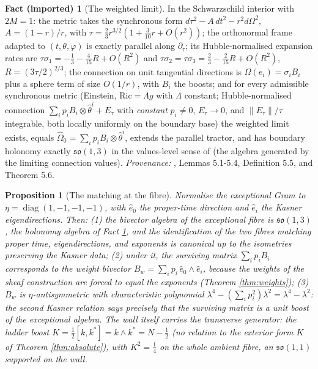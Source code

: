 \documentclass[11pt]{article}
\newtheorem{proposition}[theorem]{Proposition}
\theoremstyle{definition}
\newtheorem{fact}[theorem]{Fact (imported)}
\begin{document}
\begin{fact}[The weighted limit]\label{fact:weightedlimit}
In the Schwarzschild interior with $2M = 1$: the metric takes the synchronous form $d\tau^2 - A\,dt^2 - r^2 d\Omega^2$, $A = (1-r)/r$, with $\tau = \tfrac23 r^{3/2}(1 + \tfrac{3}{10}r + O(r^2))$; the orthonormal frame adapted to $(t, \theta, \varphi)$ is exactly parallel along $\partial_\tau$; its Hubble-normalised expansion rates are $\tau\sigma_1 = -\tfrac13 - \tfrac{4}{15}R + O(R^2)$ and $\tau\sigma_2 = \tau\sigma_3 = \tfrac23 - \tfrac{2}{15}R + O(R^2)$, $R = (3\tau/2)^{2/3}$; the connection on unit tangential directions is $\Omega(e_i) = \sigma_i B_i$ plus a sphere term of size $O(1/r)$, with $B_i$ the boosts; and for every admissible synchronous metric (Einstein, $\mathrm{Ric} = \Lambda g$ with $\Lambda$ constant; Hubble-normalised connection $\sum_i p_iB_i \otimes \hat\theta^i + E_\tau$ with \emph{constant} $p_i \neq 0$, $E_\tau \to 0$, and $\|E_\tau\|/\tau$ integrable, both locally uniformly on the boundary base) the weighted limit exists, equals $\widehat\Omega_0 = \sum_i p_i B_i \otimes \hat\theta^i$, extends the parallel tractor, and has boundary holonomy exactly $\mathfrak{so}(1,3)$ in the values-level sense of \cite[Def.~5.5]{ButlerT6} (the algebra generated by the limiting connection values). \emph{Provenance:} \cite{ButlerT6}, Lemmas 5.1-5.4, Definition 5.5, and Theorem 5.6.
\end{fact}

\begin{proposition}[The matching at the fibre]\label{prop:fibreweld}
Normalise the exceptional Gram to $\eta = \operatorname{diag}(1,-1,-1,-1)$, with $\hat e_0$ the proper-time direction and $\hat e_i$ the Kasner eigendirections. Then: (1) the bivector algebra of the exceptional fibre is $\mathfrak{so}(1,3)$, the holonomy algebra of Fact \ref{fact:weightedlimit}, and the identification of the two fibres matching proper time, eigendirections, and exponents is canonical up to the isometries preserving the Kasner data; (2) under it, the surviving matrix $\sum_i p_i B_i$ corresponds to the \emph{weight bivector} $B_w = \sum_i p_i\,\hat e_0 \wedge \hat e_i$, because the weights of the sheaf construction are forced to equal the exponents (Theorem \ref{thm:weights}); (3) $B_w$ is $\eta$-antisymmetric with characteristic polynomial $\lambda^4 - (\sum_i p_i^2)\lambda^2 = \lambda^4 - \lambda^2$: \emph{the second Kasner relation says precisely that the surviving matrix is a unit boost of the exceptional algebra}. The wall itself carries the transverse generator: the ladder boost $K = \tfrac12[k,k^*] = k \wedge k^* = N - \tfrac12$ (no relation to the exterior form $K$ of Theorem \ref{thm:absolute}), with $K^2 = \tfrac14$ on the whole ambient fibre, an $\mathfrak{so}(1,1)$ supported on the wall.
\end{proposition}
\end{document}
